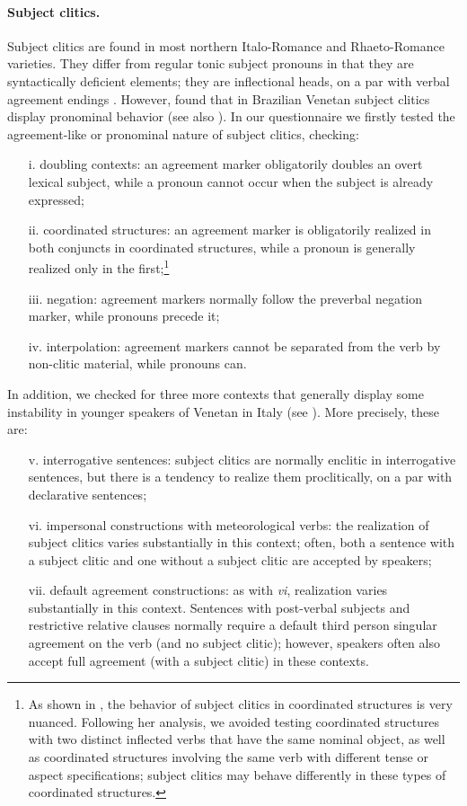 \documentclass[output=paper,hidelinks]{langscibook}
\begin{document}
\paragraph{Subject clitics.}

Subject clitics are found in most northern Italo-Romance and Rhaeto-Romance varieties. They differ from regular tonic subject pronouns in that they are syntactically deficient elements; they are inflectional heads, on a par with verbal agreement endings \citep{Rizzi1986, BrandiCordin1989, Poletto1993, Poletto2000}. However, \citet{FrassonIP} found that in Brazilian Venetan subject clitics display pronominal behavior (see also \citealt{BenincaPoletto2004}). In our questionnaire we firstly tested the agreement-like or pronominal nature of subject clitics, checking:
\begin{itemize}
    \item[i.] doubling contexts: an agreement marker obligatorily doubles an overt lexical subject, while a pronoun cannot occur when the subject is already expressed;
    \item[ii.] coordinated structures: an agreement marker is obligatorily realized in both conjuncts in coordinated structures, while a pronoun is generally realized only in the first;\footnote{As shown in \citet{Poletto2000}, the behavior of subject clitics in coordinated structures is very nuanced. Following her analysis, we avoided testing coordinated structures with two distinct inflected verbs that have the same nominal object, as well as coordinated structures involving the same verb with different tense or aspect specifications; subject clitics may behave differently in these types of coordinated structures.}
    \item[iii.] negation: agreement markers normally follow the preverbal negation marker, while pronouns precede it;
    \item[iv.] interpolation: agreement markers cannot be separated from the verb by non-clitic material, while pronouns can.
\end{itemize}
In addition, we checked for three more contexts that generally display some instability in younger speakers of Venetan in Italy (see \citealt{CasalicchioFrasson2019}). More precisely, these are:
\begin{itemize}
    \item[v.] interrogative sentences: subject clitics are normally enclitic in interrogative sentences, but there is a tendency to realize them proclitically, on a par with declarative sentences;
    \item[vi.] impersonal constructions with meteorological verbs: the realization of subject clitics varies substantially in this context; often, both a sentence with a subject clitic and one without a subject clitic are accepted by speakers;
    \item[vii.] default agreement constructions: as with \textit{vi}, realization varies substantially in this context. Sentences with post-verbal subjects and restrictive relative clauses normally require a default third person singular agreement on the verb (and no subject clitic); however, speakers often also accept full agreement (with a subject clitic) in these contexts.
\end{itemize}
\end{document}
